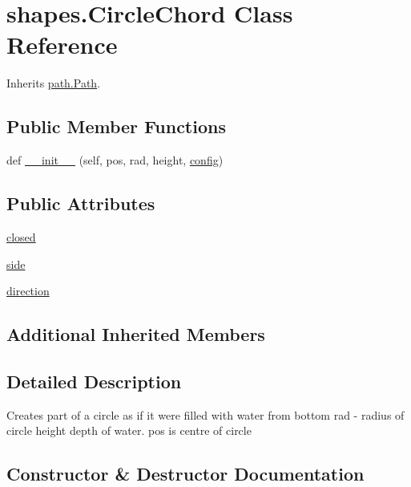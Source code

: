 \hypertarget{classshapes_1_1_circle_chord}{}\section{shapes.\+Circle\+Chord Class Reference}
\label{classshapes_1_1_circle_chord}


Inherits \hyperlink{classpath_1_1_path}{path.\+Path}.

\subsection*{Public Member Functions}
\begin{DoxyCompactItemize}
\item 
def \hyperlink{classshapes_1_1_circle_chord_a6a96d0b6ca44cd5d6f01e445b7e46108}{\+\_\+\+\_\+init\+\_\+\+\_\+} (self, pos, rad, height, \hyperlink{classpath_1_1_path_a889e352f02dba833077975ce855276ed}{config})
\end{DoxyCompactItemize}
\subsection*{Public Attributes}
\begin{DoxyCompactItemize}
\item 
\hyperlink{classshapes_1_1_circle_chord_a4707fb2cbf0f61d3957e703578942fb5}{closed}
\item 
\hyperlink{classshapes_1_1_circle_chord_af456bea9125565a678031dbdaba9f441}{side}
\item 
\hyperlink{classshapes_1_1_circle_chord_abed308bff582f79d6b673937645612a1}{direction}
\end{DoxyCompactItemize}
\subsection*{Additional Inherited Members}


\subsection{Detailed Description}
\begin{DoxyVerb}Creates part of a circle as if it were filled with water from bottom rad - radius of circle height depth of water. pos is centre of circle\end{DoxyVerb}
 

\subsection{Constructor \& Destructor Documentation}
\hypertarget{classshapes_1_1_circle_chord_a6a96d0b6ca44cd5d6f01e445b7e46108}{}
